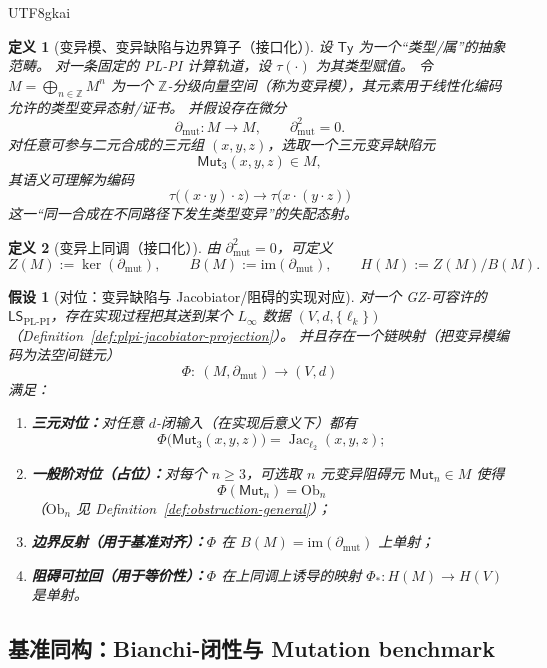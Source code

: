 \documentclass[12pt]{article}
\newtheorem{definition}{定义}[section]
\newtheorem{assumption}{假设}[section]
\newcommand{\Layer}{\ensuremath{\ell}}
\newcommand{\Jac}{\operatorname{Jac}}
\newcommand{\Ob}{\mathrm{Ob}}
\newcommand{\LSPLPI}{\ensuremath{\mathsf{LS}_{\mathrm{PL\text{-}PI}}}}
\begin{document}
\begin{CJK*}{UTF8}{gkai}
\begin{definition}[变异模、变异缺陷与边界算子（接口化）]
\label{def:mutation-defect}
设 $\mathsf{Ty}$ 为一个“类型/属”的抽象范畴。
对一条固定的 PL-PI 计算轨道，设 $\tau(\cdot)$ 为其类型赋值。
令 $M=\bigoplus_{n\in\mathbb{Z}}M^n$ 为一个 $\mathbb{Z}$-分级向量空间（称为\emph{变异模}），其元素用于线性化编码允许的类型变异态射/证书。
并假设存在微分
\[
  \partial_{\mathrm{mut}}:M\longrightarrow M,\qquad \partial_{\mathrm{mut}}^2=0.
\]
对任意可参与二元合成的三元组 $(x,y,z)$，选取一个三元\emph{变异缺陷元}
\[
  \mathsf{Mut}_3(x,y,z)\in M,
\]
其语义可理解为编码
\[
  \tau\bigl((x\cdot y)\cdot z\bigr)\longrightarrow \tau\bigl(x\cdot(y\cdot z)\bigr)
\]
这一“同一合成在不同路径下发生类型变异”的失配态射。
\end{definition}

\begin{definition}[变异上同调（接口化）]
\label{def:mutation-cohomology}
由 $\partial_{\mathrm{mut}}^2=0$，可定义
\[
  Z(M):=\ker(\partial_{\mathrm{mut}}),\qquad
  B(M):=\mathrm{im}(\partial_{\mathrm{mut}}),\qquad
  H(M):=Z(M)/B(M).
\]
\end{definition}

\begin{assumption}[对位：变异缺陷与 Jacobiator/阻碍的实现对应]
\label{ass:mutation-vs-jacobiator}
对一个 GZ-可容许的 $\LSPLPI$，存在实现过程把其送到某个 $L_\infty$ 数据 $(V,d,\{\Layer_k\})$（Definition~\ref{def:plpi-jacobiator-projection}）。
并且存在一个链映射（把变异模编码为法空间链元）
\[
  \Phi:\ (M,\partial_{\mathrm{mut}})\longrightarrow (V,d)
\]
满足：
\begin{enumerate}
  \item \textbf{三元对位：}对任意 $d$-闭输入（在实现后意义下）都有
        \[
          \Phi\bigl(\mathsf{Mut}_3(x,y,z)\bigr)=\Jac_{\Layer_2}(x,y,z);
        \]
  \item \textbf{一般阶对位（占位）：}对每个 $n\ge 3$，可选取 $n$ 元变异阻碍元 $\mathsf{Mut}_n\in M$ 使得
        \[
          \Phi(\mathsf{Mut}_n)=\Ob_n
        \]
        （$\Ob_n$ 见 Definition~\ref{def:obstruction-general}）；
  \item \textbf{边界反射（用于基准对齐）：}$\Phi$ 在 $B(M)=\mathrm{im}(\partial_{\mathrm{mut}})$ 上单射；
  \item \textbf{阻碍可拉回（用于等价性）：}$\Phi$ 在上同调上诱导的映射 $\Phi_*:H(M)\to H(V)$ 是单射。
\end{enumerate}
\end{assumption}

\subsection{基准同构：Bianchi-闭性与 Mutation benchmark}


\end{CJK*}
\end{document}
